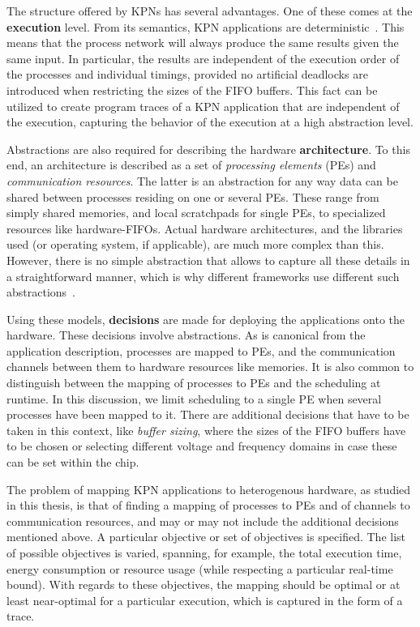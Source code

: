 \documentclass[sigplan,10pt]{acmart}
\begin{document}
The structure offered by KPNs has several advantages. One of these comes at the \textbf{execution} level. 
From its semantics, KPN applications are deterministic~\cite{kahn74}. 
This means that the process network will always produce the same results given the same input.
In particular, the results are independent of the execution order of the processes and individual timings,
provided no artificial deadlocks are introduced when restricting the sizes of the FIFO buffers.
This fact can be utilized to create program traces of a KPN application that are independent of the execution,
capturing the behavior of the execution at a high abstraction level.

Abstractions are also required for describing the hardware \textbf{architecture}.
To this end, an architecture is described as a set of \emph{processing elements} (PEs) and \emph{communication resources}.
The latter is an abstraction for any way data can be shared between processes residing on one or several PEs. 
These range from simply shared memories, and local scratchpads for single PEs, to specialized resources like hardware-FIFOs.
Actual hardware architectures, and the libraries used (or operating system, if applicable), are much more complex than this.
However, there is no simple abstraction that allows to capture all these details in a straightforward manner, 
which is why different frameworks use different such abstractions~\cite{goens_mcsoc16}.

Using these models, \textbf{decisions} are made for deploying the applications onto the hardware.
These decisions involve abstractions.
As is canonical from the application description, processes are mapped to PEs, 
and the communication channels between them to hardware resources like memories.
It is also common to distinguish between the mapping of processes to PEs and the scheduling at runtime.
In this discussion, we limit scheduling to a single PE when several processes have been mapped to it.
There are additional decisions that have to be taken in this context, like \emph{buffer sizing}, where the sizes of the
FIFO buffers have to be chosen or selecting different voltage and frequency domains in case these can be set within the chip. 

The problem of mapping KPN applications to heterogenous hardware, as studied in this thesis, is that of
finding a mapping of processes to PEs and of channels to communication resources, and may or may not include the additional decisions mentioned above.
A particular objective or set of objectives is specified.
The list of possible objectives is varied, spanning, for example, the total execution time, energy consumption or resource usage (while respecting a particular real-time bound).
With regards to these objectives, the mapping should be optimal or at least near-optimal for a particular execution, which is captured in the form of a trace.
\end{document}
